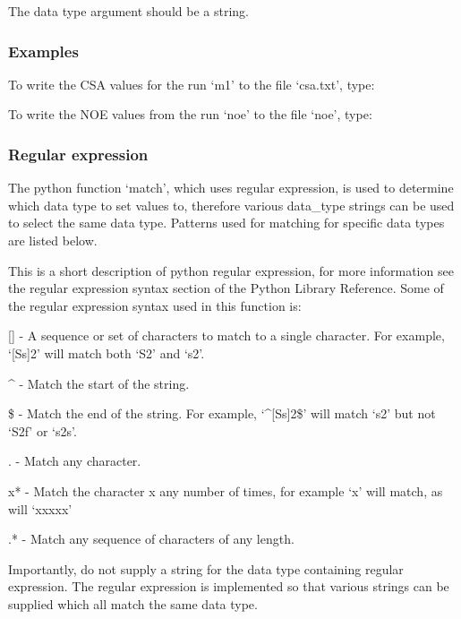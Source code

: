 The data type argument should be a string.


\subsubsection{Examples}

To write the CSA values for the run `m1' to the file `csa.txt', type:



To write the NOE values from the run `noe' to the file `noe', type:





\subsubsection{Regular expression}

The python function `match', which uses regular expression, is used to determine which data
type to set values to, therefore various data\_type strings can be used to select the same
data type.  Patterns used for matching for specific data types are listed below.

This is a short description of python regular expression, for more information see the
regular expression syntax section of the Python Library Reference.  Some of the regular
expression syntax used in this function is:

    [] - A sequence or set of characters to match to a single character.  For example,
    `[Ss]2' will match both `S2' and `s2'.

    \^{} - Match the start of the string.

    \$ - Match the end of the string.  For example, `\^{}[Ss]2\$' will match `s2' but not `S2f'
    or `s2s'.

    . - Match any character.

    x* - Match the character x any number of times, for example `x' will match, as will
    `xxxxx'

    .* - Match any sequence of characters of any length.

Importantly, do not supply a string for the data type containing regular expression.  The
regular expression is implemented so that various strings can be supplied which all match
the same data type.



